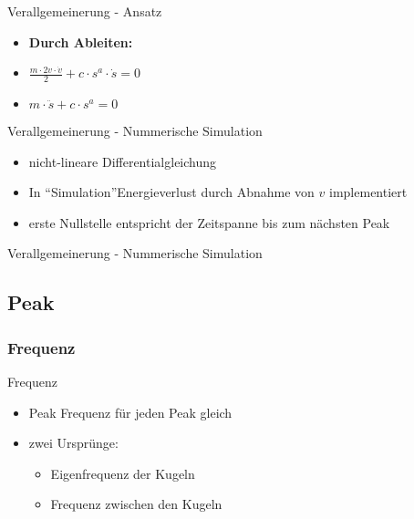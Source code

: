 \documentclass[12pt]{beamer}
\begin{document}
\begin{frame}{Verallgemeinerung - Ansatz}
\begin{itemize}
\item<1-> \textbf{Durch Ableiten:}
\item<2->[ ] $\frac{m\cdot 2v\cdot \dot{v}}{2}+c\cdot s^a\cdot\dot{s}=0$
\item<3->[$\Leftrightarrow$] $m\cdot \ddot{s}+c\cdot s^a=0$
\end{itemize}
\end{frame}

\begin{frame}{Verallgemeinerung - Nummerische Simulation}
\begin{itemize}
\item<1-> nicht-lineare Differentialgleichung
\item<2-> In "`Simulation"'Energieverlust durch Abnahme von $v$ implementiert
\item<3-> erste Nullstelle entspricht der Zeitspanne bis zum nächsten Peak
\end{itemize}
\end{frame}

\begin{frame}{Verallgemeinerung - Nummerische Simulation}
\end{frame}

\subsection{Peak}
\subsubsection{Frequenz}
\begin{frame}{Frequenz}
\begin{itemize}
\item<1-> Peak Frequenz für jeden Peak gleich
\item<2-> zwei Ursprünge:
	\begin{itemize}
	\item<3-> Eigenfrequenz der Kugeln
	\item<4-> Frequenz zwischen den Kugeln
	\end{itemize}
\end{itemize}
\end{frame}
\end{document}
